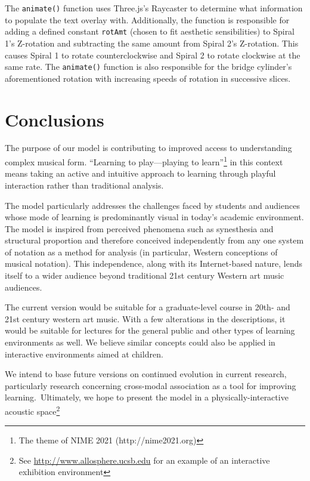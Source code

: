 \documentclass[sigconf]{nimeart}
\begin{document}
The \texttt{animate()} function uses Three.js's Raycaster to determine what information to populate the text overlay with. Additionally, the function is responsible for adding a defined constant \texttt{rotAmt} (chosen to fit aesthetic sensibilities) to Spiral 1's Z-rotation and subtracting the same amount from Spiral 2's Z-rotation. This causes Spiral 1 to rotate counterclockwise and Spiral 2 to rotate clockwise at the same rate. The \texttt{animate()} function is also responsible for the bridge cylinder's aforementioned rotation with increasing speeds of rotation in successive slices.

\section{Conclusions}\label{conclusions}

The purpose of our model is contributing to improved access to understanding complex musical form. ``Learning to play---playing to learn''\footnote{The theme of NIME 2021 (http://nime2021.org)} in this context means taking an active and intuitive approach to learning through playful interaction rather than traditional analysis.

The model particularly addresses the challenges faced by students and audiences whose mode of learning is predominantly visual in today's academic environment. The model is inspired from perceived phenomena such as synesthesia and structural proportion and therefore conceived independently from any one system of notation as a method for analysis (in particular, Western conceptions of musical notation). This independence, along with its Internet-based nature, lends itself to a wider audience beyond traditional 21st century Western art music audiences.

The current version would be suitable for a graduate-level course in 20th- and 21st century western art music. With a few alterations in the descriptions, it would be suitable for lectures for the general public and other types of learning environments as well. We believe similar concepts could also be applied in interactive environments aimed at children.~

We intend to base future versions on continued evolution in current research, particularly research concerning cross-modal association as a tool for improving learning.~Ultimately, we hope to present the model in a physically-interactive acoustic space\footnote{See \href{http://www.allosphere.ucsb.edu/collaborate/}{http://www.allosphere.ucsb.edu} for an example of an interactive exhibition environment}
\end{document}
